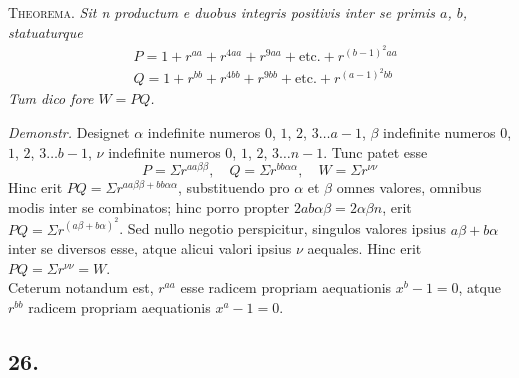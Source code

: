 \documentclass[twoside,12pt]{memoir}
\begin{document}
\textsc{Theorema.} \textit{Sit n productum e duobus integris positivis inter se primis \(a\), \(b\), statuaturque}
\[\begin{aligned}
& P=1+r^{a a}+r^{4 a a}+r^{9 a a}+\text{etc.}+r^{(b-1)^{2} a a} \\
& Q=1+r^{b b}+r^{4 b b}+r^{9 b b}+\text{etc.}+r^{(a-1)^{2} b b}
\end{aligned}\]
\textit{Tum dico fore \(W=P Q\).}
 
\textit{Demonstr.} Designet \(\alpha\) indefinite numeros \(0\), \(1\), \(2\), \(3 \ldots a-1\), \(\beta\) indefinite numeros \(0\), \(1\), \(2\), \(3 \ldots b-1\), \(\nu\) indefinite numeros \(0\), \(1\), \(2\), \(3 \ldots n-1\). Tunc patet esse
\[P=\Sigma r^{a a \beta \beta}, \quad Q=\Sigma r^{b b \alpha \alpha}, \quad W=\Sigma r^{\nu \nu}\]
Hinc erit \(P Q=\Sigma r^{a a \beta \beta +b b \alpha \alpha}\), substituendo pro \(\alpha\) et \(\beta\) omnes valores, omnibus modis inter se combinatos; hinc porro propter \(2 a b \alpha \beta =2 \alpha \beta n\), erit \(P Q=\Sigma r^{(a \beta+b \alpha)^{2}}\). Sed nullo negotio perspicitur, singulos valores ipsius \(a \beta+b \alpha\) inter se diversos esse, atque alicui valori ipsius \(\nu\) aequales. Hinc erit \(P Q=\Sigma r^{\nu \nu}=W\).\\
 
Ceterum notandum est, \(r^{a a}\) esse radicem propriam aequationis \(x^{b}-1=0\), atque \(r^{b b}\) radicem propriam aequationis \(x^{a}-1=0\).\pagebreak%

\subsection*{26.}
 
\end{document}
